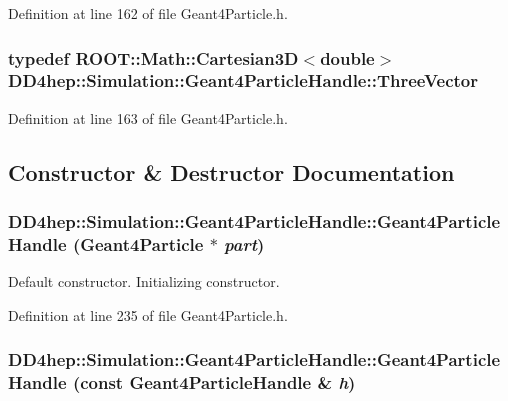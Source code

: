 Definition at line 162 of file Geant4Particle.h.\hypertarget{class_d_d4hep_1_1_simulation_1_1_geant4_particle_handle_a8aabe9ad3397b25aae653c42ec82021a}{
\subsubsection[{ThreeVector}]{\setlength{\rightskip}{0pt plus 5cm}typedef ROOT::Math::Cartesian3D$<$double$>$ {\bf DD4hep::Simulation::Geant4ParticleHandle::ThreeVector}}}
\label{class_d_d4hep_1_1_simulation_1_1_geant4_particle_handle_a8aabe9ad3397b25aae653c42ec82021a}


Definition at line 163 of file Geant4Particle.h.

\subsection{Constructor \& Destructor Documentation}
\hypertarget{class_d_d4hep_1_1_simulation_1_1_geant4_particle_handle_aae0f6cff704f2f70a13941b9d9d2b590}{
\subsubsection[{Geant4ParticleHandle}]{\setlength{\rightskip}{0pt plus 5cm}DD4hep::Simulation::Geant4ParticleHandle::Geant4ParticleHandle ({\bf Geant4Particle} $\ast$ {\em part})}}
\label{class_d_d4hep_1_1_simulation_1_1_geant4_particle_handle_aae0f6cff704f2f70a13941b9d9d2b590}


Default constructor. Initializing constructor. 

Definition at line 235 of file Geant4Particle.h.\hypertarget{class_d_d4hep_1_1_simulation_1_1_geant4_particle_handle_a8e62699ff44968d5f8b9926a5512450f}{
\subsubsection[{Geant4ParticleHandle}]{\setlength{\rightskip}{0pt plus 5cm}DD4hep::Simulation::Geant4ParticleHandle::Geant4ParticleHandle (const {\bf Geant4ParticleHandle} \& {\em h})}}
\label{class_d_d4hep_1_1_simulation_1_1_geant4_particle_handle_a8e62699ff44968d5f8b9926a5512450f}


